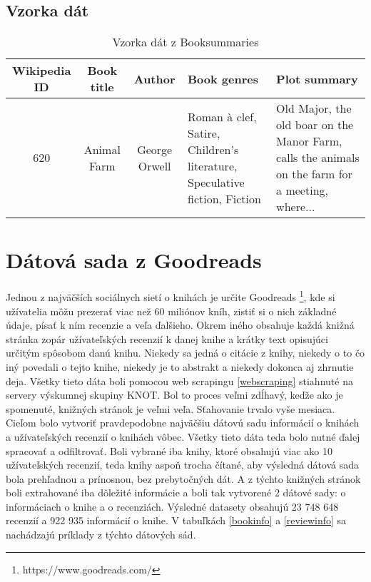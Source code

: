 \subsection*{Vzorka dát}

\begin{table}[hbt]
\centering
\caption{Vzorka dát z Booksummaries}
\label{booksummaries}
\begin{tabular}{|c|c|c|
>{\centering\arraybackslash}m{7em}|
>{\centering\arraybackslash}m{7em}|}
\hline
Wikipedia ID & Book title & Author & Book genres & Plot summary \\
\hline
620 & Animal Farm & George Orwell & Roman à clef, Satire, Children's literature, Speculative fiction, Fiction &  Old Major, the old boar on the Manor Farm, calls the animals on the farm for a meeting, where...\\ 
\hline

\end{tabular}
\end{table}

\section{Dátová sada z Goodreads}

Jednou z najväčších sociálnych sietí o knihách je určite Goodreads \footnote{https://www.goodreads.com/}, kde si užívatelia môžu prezerať viac než 60 miliónov kníh, zistiť si o nich základné údaje, písať k ním recenzie a veľa ďalšieho. Okrem iného obsahuje každá knižná stránka zopár užívateľských recenzií k danej knihe a krátky text opisujúci určitým spôsobom danú knihu. Niekedy sa jedná o citácie z knihy, niekedy o to čo iný povedali o tejto knihe, niekedy je to abstrakt a niekedy dokonca aj zhrnutie deja. Všetky tieto dáta boli pomocou web scrapingu \ref{webscraping} stiahnuté na servery výskumnej skupiny KNOT. Bol to proces veľmi zdĺhavý, keďže ako je spomenuté, knižných stránok je veľmi veľa. Sťahovanie trvalo vyše mesiaca. Cieľom bolo vytvoriť pravdepodobne najväčšiu dátovú sadu informácií o knihách a užívateľských recenzií o knihách vôbec. Všetky tieto dáta teda bolo nutné ďalej spracovať a odfiltrovať. Boli vybrané iba knihy, ktoré obsahujú viac ako 10 užívateľských recenzií, teda knihy aspoň trocha čítané, aby výsledná dátová sada bola prehľadnou a prínosnou, bez prebytočných dát. A z týchto knižných stránok boli extrahované iba dôležité informácie a boli tak vytvorené 2 dátové sady: o informáciach o knihe a o recenziách. Výsledné datasety obsahujú 23 748 648 recenzií a 922 935 informácií o knihe. V tabuľkách 
\ref{bookinfo} a \ref{reviewinfo} sa nachádzajú príklady z týchto dátových sád.

